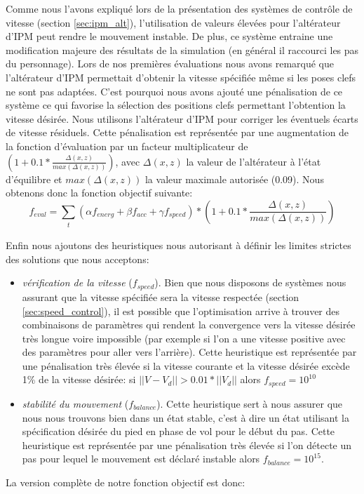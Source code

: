 \documentclass[runningheads,a4paper]{llncs}
\begin{document}
Comme nous l'avons expliqué lors de la présentation des systèmes de contrôle de vitesse (section \ref{sec:ipm_alt}), l'utilisation de valeurs élevées pour l'altérateur d'IPM peut rendre le mouvement instable. De plus, ce système entraine une modification majeure des résultats de la simulation (en général il raccourci les pas du personnage). Lors de nos premières évaluations nous avons remarqué que l'altérateur d'IPM permettait d'obtenir la vitesse spécifiée même si les poses clefs ne sont pas adaptées. C'est pourquoi nous avons ajouté une pénalisation de ce système ce qui favorise la sélection des positions clefs permettant l'obtention la vitesse désirée. Nous utilisons l'altérateur d'IPM pour corriger les éventuels écarts de vitesse résiduels. Cette pénalisation est représentée par une augmentation de la fonction d'évaluation par un facteur multiplicateur de $(1+0.1*\frac{\Delta(x,z)}{max(\Delta(x,z))})$, avec $\Delta(x,z)$ la valeur de l'altérateur à l'état d'équilibre et $max(\Delta(x,z))$ la valeur maximale autorisée (0.09). Nous obtenons donc la fonction objectif suivante:
$$
f_{eval} = \sum_{\substack{t}} (\alpha f_{energ} + \beta f_{acc} + \gamma f_{speed})*(1+0.1*\frac{\Delta(x,z)}{max(\Delta(x,z))}) 
$$

Enfin nous ajoutons des heuristiques nous autorisant à définir les limites strictes des solutions que nous acceptons:
\begin{itemize}
\item{\textit{vérification de la vitesse} ($f_{speed}$). Bien que nous disposons de systèmes nous assurant que la vitesse spécifiée sera la vitesse respectée (section \ref{sec:speed_control}), il est possible que l'optimisation arrive à trouver des combinaisons de paramètres qui rendent la convergence vers la vitesse désirée très longue voire impossible (par exemple si l'on a une vitesse positive avec des paramètres pour aller vers l'arrière). Cette heuristique est représentée par une pénalisation très élevée si la vitesse courante et la vitesse désirée excède 1\% de la vitesse désirée: si $||V-V_d||>0.01*||V_d||$ alors $f_{speed}=10^{10}$}
\item{\textit{stabilité du mouvement} ($f_{balance}$).  Cette heuristique sert à nous assurer que nous nous trouvons bien dans un état stable, c'est à dire un état utilisant la spécification désirée du pied en phase de vol pour le début du pas. Cette heuristique est représentée par une pénalisation très élevée si l'on détecte un pas pour lequel le mouvement est déclaré instable alors $f_{balance}=10^{15}$.  }
\end{itemize}
 La version complète de notre fonction objectif est donc:
\end{document}
